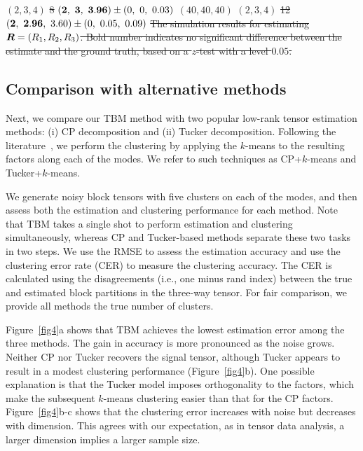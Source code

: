 \documentclass[11pt]{article}
\theoremstyle{plain}
\theoremstyle{definition}
\providecommand{\DIFdeltex}[1]{{\protect\color{red}\sout{#1}}}                      %
\providecommand{\DIFaddbegin}{} %
\providecommand{\DIFaddend}{} %
\providecommand{\DIFdelend}{} %
\providecommand{\DIFdelFL}[1]{\DIFdel{#1}} %
\providecommand{\DIFdel}[1]{\texorpdfstring{\DIFdeltex{#1}}{}} %
\begin{document}
\DIFdelFL{$(2,3,4)$}%
\DIFdelFL{8}%
\DIFdelFL{$({\bf 2},{\bf \ 3},\ {\bf 3.96})\pm (0,\ 0,\ 0.03)$ }%
\DIFdelFL{$(40,40,40)$}%
\DIFdelFL{$(2,3,4)$}%
\DIFdelFL{12}%
\DIFdelFL{$({\bf 2},\ {\bf 2.96},\ 3.60)\pm (0,\ 0.05,\ 0.09)$}%
{%
\DIFdelFL{The simulation results for estimating $\bm{R}=(R_1,R_2,R_3)$. Bold number indicates no significant difference between the estimate and the ground truth, based on a $z$-test with a level $0.05$.}}%

\DIFdelend \subsection{Comparison with alternative methods}
\DIFaddbegin \vspace{-.2cm}
\DIFaddend Next, we compare our TBM method with two popular low-rank tensor estimation methods: (i) CP decomposition and (ii) Tucker decomposition. Following the literature~\cite{chi2018provable,hore2016tensor,kolda2008scalable}, we perform the clustering by applying the $k$-means to the resulting factors along each of the modes. We refer to such techniques as CP+$k$-means and Tucker+$k$-means. 

We generate noisy block tensors with five clusters on each of the modes, and then assess both the estimation and clustering performance for each method. Note that TBM takes a single shot to perform estimation and clustering simultaneously, whereas CP and Tucker-based methods separate these two tasks in two steps. We use the RMSE to assess the estimation accuracy and use the clustering error rate (CER) to measure the clustering accuracy. The CER is calculated using the disagreements (i.e., one minus rand index) between the true and estimated block partitions in the three-way tensor. For fair comparison, we provide all methods the true number of clusters. 

Figure~\ref{fig4}a shows that TBM achieves the lowest estimation error among the three methods. The gain in accuracy is more pronounced as the noise grows. Neither CP nor Tucker recovers the signal tensor, although Tucker appears to result in a modest clustering performance (Figure~\ref{fig4}b). One possible explanation is that the Tucker model imposes orthogonality to the factors, which make the subsequent $k$-means clustering easier than that for the CP factors. Figure~\ref{fig4}b-c shows that the clustering error increases with noise but decreases with dimension. This agrees with our expectation, as in tensor data analysis, a larger dimension implies a larger sample size. 
\end{document}
